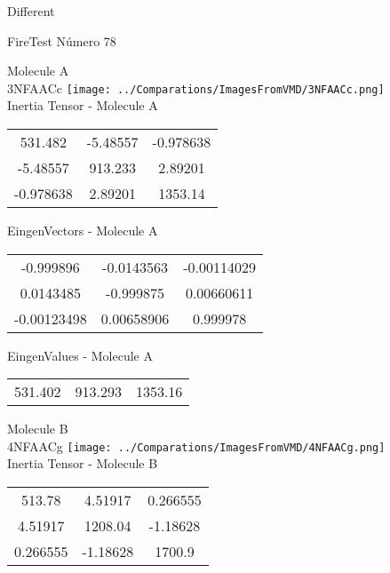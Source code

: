 \begin{center}
\vtab
\vtab
\textcolor{NavyBlue}{\Large Different}
\end{center}

 \newpage

\vtab[-2cm]
\begin{center}
{\large FireTest \tab Número 78}
\end{center}
\begin{multicols}{2}
\begin{center}

Molecule A \\ 
3NFAACc
\texttt{[image: ../Comparations/ImagesFromVMD/3NFAACc.png]}
\\
Inertia Tensor - Molecule A \\
\vtab

\begin{tabular}{|c c c|}
531.482	 & 	-5.48557	 & 	-0.978638	 \\
-5.48557	 & 	913.233	 & 	2.89201	 \\
-0.978638	 & 	2.89201	 & 	1353.14
\end{tabular}

\vtab
 EingenVectors - Molecule A     \\
\vtab
\begin{tabular}{|c c c|}
-0.999896	 & 	-0.0143563	 & 	-0.00114029	 \\
0.0143485	 & 	-0.999875	 & 	0.00660611	 \\
-0.00123498	 & 	0.00658906	 & 	0.999978
\end{tabular}

\vtab
 EingenValues - Molecule A     \\
\vtab
\begin{tabular}{|c c c|}
531.402	 & 	913.293	 & 	1353.16	 \\
\end{tabular}
\columnbreak

Molecule B \\ 
4NFAACg
\texttt{[image: ../Comparations/ImagesFromVMD/4NFAACg.png]}
\\
Inertia Tensor - Molecule B \\
\vtab

\begin{tabular}{|c c c|}
513.78	 & 	4.51917	 & 	0.266555	 \\
4.51917	 & 	1208.04	 & 	-1.18628	 \\
0.266555	 & 	-1.18628	 & 	1700.9
\end{tabular}


\end{center}
\end{multicols}
